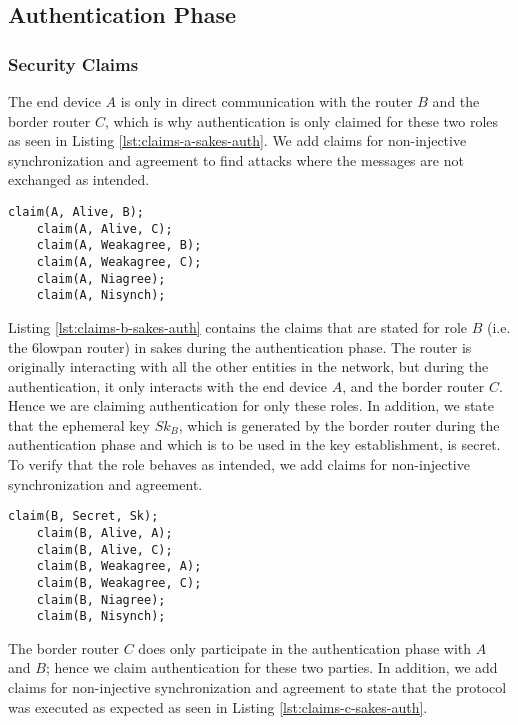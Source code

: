\subsection{Authentication Phase}
\label{subsec:sakes-auth}

\subsubsection{Security Claims}

The end device $A$ is only in direct communication with the router $B$ and the border router $C$, which is why authentication is only claimed for these two roles as seen in Listing \ref{lst:claims-a-sakes-auth}. We add claims for non-injective synchronization and agreement to find attacks where the messages are not exchanged as intended.\\

\begin{lstlisting}[caption={Security claims for role A during the authentication phase in SAKES.}, label={lst:claims-a-sakes-auth}]
	claim(A, Alive, B);
	claim(A, Alive, C);
	claim(A, Weakagree, B);
	claim(A, Weakagree, C);
	claim(A, Niagree);
	claim(A, Nisynch);
\end{lstlisting}


Listing \ref{lst:claims-b-sakes-auth} contains the claims that are stated for role $B$ (i.e. the \gls{6lowpan} router) in \gls{sakes} during the authentication phase. The router is originally interacting with all the other entities in the network, but during the authentication, it only interacts with the end device $A$, and the border router $C$. Hence we are claiming authentication for only these roles. In addition, we state that the ephemeral key $Sk_B$, which is generated by the border router during the authentication phase and which is to be used in the key establishment, is secret. To verify that the role behaves as intended, we add claims for non-injective synchronization and agreement.\\

\begin{lstlisting}[caption={Security claims for role B during the authentication phase in SAKES.}, label={lst:claims-b-sakes-auth}]
	claim(B, Secret, Sk);
	claim(B, Alive, A);
	claim(B, Alive, C);
	claim(B, Weakagree, A);
	claim(B, Weakagree, C);
	claim(B, Niagree);
	claim(B, Nisynch);
\end{lstlisting}

The border router $C$ does only participate in the authentication phase with $A$ and $B$; hence we claim authentication for these two parties. In addition, we add claims for non-injective synchronization and agreement to state that the protocol was executed as expected as seen in Listing \ref{lst:claims-c-sakes-auth}.\\

